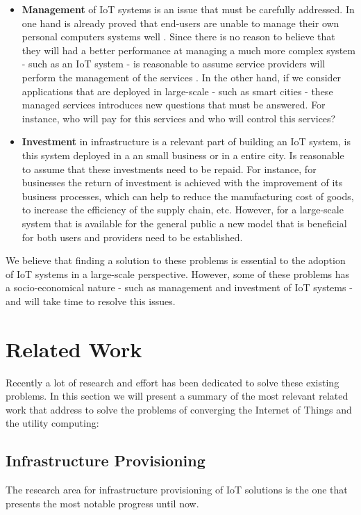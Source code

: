 \begin{itemize}
  \item \textbf{Management} of IoT systems is an issue that must be carefully addressed. In one hand
  is already proved that end-users are unable to manage their own personal computers systems well
  \cite{doll1988measurement}. Since there is no reason to believe that they will had a better
  performance at managing a much more complex system - such as an \gls{IoT} system - is reasonable to
  assume service providers will perform the management of the services . In the other hand, if we
  consider applications that are deployed in large-scale - such as smart cities - these managed
  services introduces new questions that must be answered. For instance, who will pay for this
  services and who will control this services?
  \item \textbf{Investment} in infrastructure is a relevant part of building an \gls{IoT} system,
  is this system deployed in a an small business or in a entire city. Is reasonable to assume that
  these investments need to be repaid. For instance, for businesses the return of investment is
  achieved with the improvement of its business processes, which can help to reduce the manufacturing
  cost of goods, to increase the efficiency of the supply chain, etc. However, for a large-scale
  system that is available for the general public a new model that is beneficial for both users and
  providers need to be established.
\end{itemize}

We believe that finding a solution to these problems is essential to the adoption of \gls{IoT} systems
in a large-scale perspective. However, some of these problems has a socio-economical nature - such as
management and investment of \gls{IoT} systems - and will take time to resolve this issues.

\section{Related Work}
\label{section:related_work}
Recently a lot of research and effort has been dedicated to solve these existing problems. In this
section we will present a summary of the most relevant related work that address to solve the
problems of converging the Internet of Things and the utility computing:

\subsection{Infrastructure Provisioning}
\label{sub:provisioning}
The research area for infrastructure provisioning of IoT solutions is the one that presents the most
notable progress until now.

